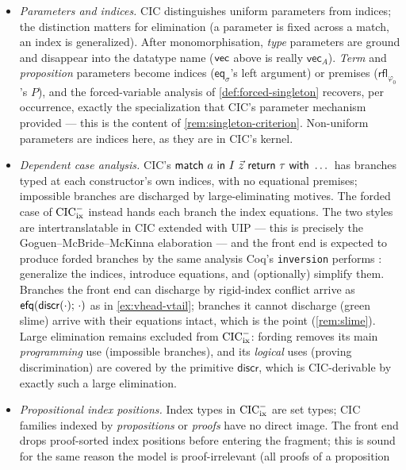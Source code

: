 \begin{itemize}[leftmargin=2em]
\item \emph{Parameters and indices.}  CIC distinguishes uniform
  parameters from indices; the distinction matters for elimination (a
  parameter is fixed across a match, an index is generalized).  After
  monomorphisation, \emph{type} parameters are ground and disappear into
  the datatype name ($\mathsf{vec}$ above is really
  $\mathsf{vec}_A$).  \emph{Term} and \emph{proposition} parameters
  become indices ($\mathsf{eq}_\sigma$'s left argument) or premises
  ($\mathsf{rfl}_{\varphi_0}$'s $P$), and the forced-variable analysis of
  \cref{def:forced-singleton} recovers, per occurrence, exactly the
  specialization that CIC's parameter mechanism provided --- this is the
  content of \cref{rem:singleton-criterion}.  Non-uniform parameters are
  indices here, as they are in CIC's kernel.
\item \emph{Dependent case analysis.}  CIC's
  $\mathsf{match}\ a\ \mathsf{in}\ I\ \tup{z}\ \mathsf{return}\
  \tau\ \mathsf{with}\ \dots$ has branches typed at each constructor's
  own indices, with no equational premises; impossible branches are
  discharged by large-eliminating motives.  The forded case of $\mathrm{CIC}^{-}_{\mathrm{ix}}$
  instead hands each branch the index equations.  The two styles are
  intertranslatable in CIC extended with UIP --- this is precisely the
  Goguen--McBride--McKinna elaboration \cite{GoguenEtAl2006} --- and the
  front end is expected to produce forded branches by the same analysis
  Coq's \texttt{inversion} performs \cite{CornesTerrasse1995,Monin2010}:
  generalize the indices, introduce equations, and (optionally) simplify
  them.  Branches the front end can discharge by rigid-index conflict
  arrive as $\mathsf{efq}(\mathsf{discr}(\cdot);\,\cdot)$ as in
  \cref{ex:vhead-vtail}; branches it cannot discharge (green slime)
  arrive with their equations intact, which is the point
  (\cref{rem:slime}).  Large elimination remains excluded from $\mathrm{CIC}^{-}_{\mathrm{ix}}$:
  fording removes its main \emph{programming} use (impossible branches),
  and its \emph{logical} uses (proving discrimination) are covered by
  the primitive $\mathsf{discr}$, which is CIC-derivable by exactly such
  a large elimination.
\item \emph{Propositional index positions.}  Index types in $\mathrm{CIC}^{-}_{\mathrm{ix}}$ are
  set types; CIC families indexed by \emph{propositions} or \emph{proofs}
  have no direct image.  The front end drops proof-sorted index
  positions before entering the fragment; this is sound for the same
  reason the model is proof-irrelevant (all proofs of a proposition

\end{itemize}
